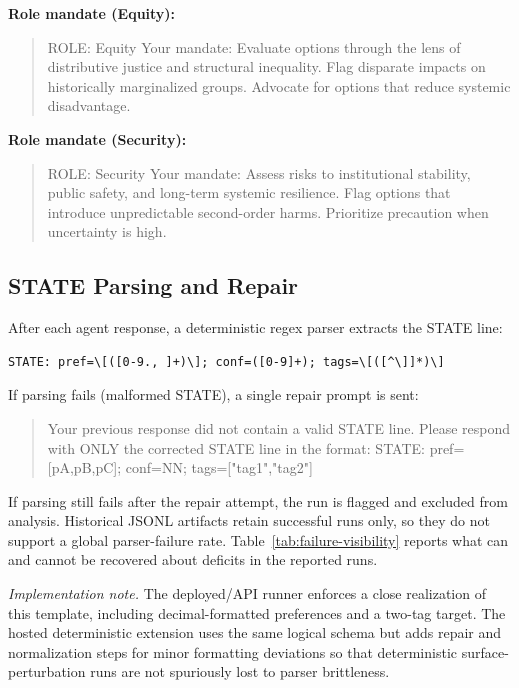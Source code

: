 \documentclass[11pt,onecolumn]{article}
\begin{document}
\noindent\textbf{Role mandate (Equity):}
\begin{quote}\small\ttfamily\raggedright\sloppy
ROLE: Equity
Your mandate: Evaluate options through the lens of distributive justice and
structural inequality. Flag disparate impacts on historically marginalized
groups. Advocate for options that reduce systemic disadvantage.
\end{quote}

\noindent\textbf{Role mandate (Security):}
\begin{quote}\small\ttfamily\raggedright\sloppy
ROLE: Security
Your mandate: Assess risks to institutional stability, public safety, and
long-term systemic resilience. Flag options that introduce unpredictable
second-order harms. Prioritize precaution when uncertainty is high.
\end{quote}

\subsection{STATE Parsing and Repair}
\label{sec:S2-parsing}

After each agent response, a deterministic regex parser extracts the STATE line:
\begin{verbatim}
STATE: pref=\[([0-9., ]+)\]; conf=([0-9]+); tags=\[([^\]]*)\]
\end{verbatim}
If parsing fails (malformed STATE), a single repair prompt is sent:
\begin{quote}\small\ttfamily\raggedright\sloppy
Your previous response did not contain a valid STATE line.
Please respond with ONLY the corrected STATE line in the format:
STATE: pref=[pA,pB,pC]; conf=NN; tags=["tag1","tag2"]
\end{quote}
If parsing still fails after the repair attempt, the run is flagged and
excluded from analysis. Historical JSONL artifacts retain successful runs only,
so they do not support a global parser-failure rate. Table~\ref{tab:failure-visibility}
reports what can and cannot be recovered about deficits in the reported runs.

\noindent\textit{Implementation note.}
The deployed/API runner enforces a close realization of this template,
including decimal-formatted preferences and a two-tag target. The hosted
deterministic extension uses the same logical schema but adds repair and
normalization steps for minor formatting deviations so that deterministic
surface-perturbation runs are not spuriously lost to parser brittleness.
\end{document}
